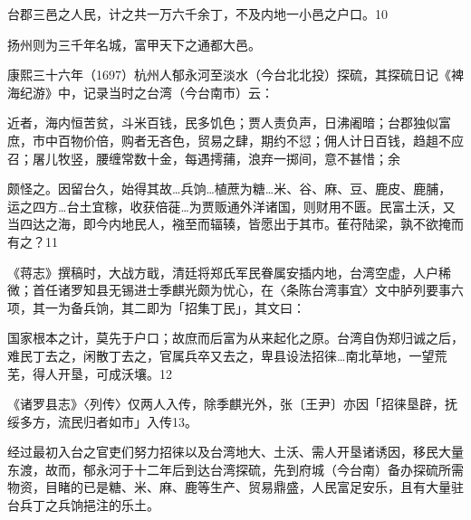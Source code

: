 \begin{BookQuote}
台郡三邑之人民，计之共一万六千余丁，不及内地一小邑之户口。10
\end{BookQuote}

扬州则为三千年名城，富甲天下之通都大邑。

康熙三十六年（1697）杭州人郁永河至淡水（今台北北投）探硫，其探硫日记《裨海纪游》中，记录当时之台湾（今台南市）云：

\begin{BookQuote}
近者，海内恒苦贫，斗米百钱，民多饥色；贾人责负声，日沸阇暗；台郡独似富庶，市中百物价倍，购者无吝色，贸易之肆，期约不愆；佣人计日百钱，趋趄不应召；屠儿牧竖，腰缠常数十金，每遇摴蒱，浪弃一掷间，意不甚惜；余
\end{BookQuote}

\vfill
\begin{BookNotes}
\end{BookNotes}

\begin{BookQuote}
颇怪之。因留台久，始得其故…兵饷…植蔗为糖…米、谷、麻、豆、鹿皮、鹿脯，运之四方…台土宜稼，收获倍蓰…为贾贩通外洋诸国，则财用不匮。民富土沃，又当四达之海，即今内地民人，襁至而辐辏，皆愿出于其市。萑苻陆梁，孰不欲掩而有之？11
\end{BookQuote}

《蒋志》撰稿时，大战方戢，清廷将郑氏军民眷属安插内地，台湾空虚，人户稀微；首任诸罗知县无锡进士季麒光颇为忧心，在〈条陈台湾事宜〉文中胪列要事六项，其一为备兵饷，其二即为「招集丁民」，其文曰：

\begin{BookQuote}
国家根本之计，莫先于户口；故庶而后富为从来起化之原。台湾自伪郑归诚之后，难民丁去之，闲散丁去之，官属兵卒又去之，卑县设法招徕…南北草地，一望荒芜，得人开垦，可成沃壤。12
\end{BookQuote}

《诸罗县志》〈列传〉仅两人入传，除季麒光外，张〔王尹〕亦因「招徕垦辟，抚绥多方，流民归者如市」入传13。

经过最初入台之官吏们努力招徕以及台湾地大、土沃、需人开垦诸诱因，移民大量东渡，故而，郁永河于十二年后到达台湾探硫，先到府城（今台南）备办探硫所需物资，目睹的已是糖、米、麻、鹿等生产、贸易鼎盛，人民富足安乐，且有大量驻台兵丁之兵饷挹注的乐土。

